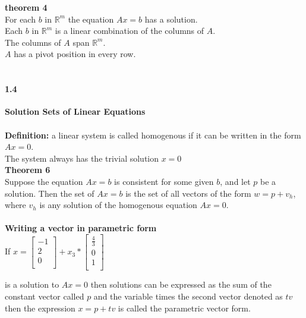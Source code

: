 \documentclass[14pt]{extreport}
\begin{document}
\textbf{theorem 4}\\
For each $b$ in $\mathbb{R}^m$ the equation $Ax=b$ has a solution.\\

Each $b$ in $\mathbb{R}^m$ is a linear combination of the columns of $A$.\\

The columns of $A$ span $\mathbb{R}^m$.\\

$A$ has a pivot position in every row.\\\\


\paragraph{1.4}\textbf{Solution Sets of Linear Equations}\\\\

\textbf{Definition:} a linear system is called homogenous if it can be written in the form $Ax =0$.\\

The system always has the trivial solution $x = 0$\\


\textbf{Theorem 6}\\
Suppose the equation $Ax = b$ is consistent for some given $b$, and let $p$ be a solution. Then the set of $Ax=b$ is the set of all vectors of the form $w = p + v_h$, where $v_h$ is any solution of the homogenous equation $Ax = 0$.\\\\

\textbf{Writing a vector in parametric form}\\
If 
$x = \begin{bmatrix}
	-1\\
	2\\
	0\\
	\end{bmatrix}
	+ x_3 *
	\begin{bmatrix}
	\frac{4}{3}\\
	0\\
	1\\
	\end{bmatrix}$
	
	is a solution to $Ax = 0$ then solutions can be expressed as the sum of the constant vector called $p$ and the variable times the second vector denoted as $tv$ then the expression $x=p+tv$ is called the parametric vector form.\\\\
\end{document}
